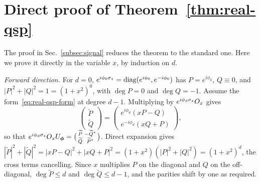 \appendix

\section{Direct proof of Theorem~\ref{thm:real-qsp}}
\label{app:thm-real}

The proof in Sec.~\ref{subsec:signal} reduces the theorem to the
standard one.  Here we prove it directly in the variable $x$, by
induction on $d$.

\emph{Forward direction.}  For $d=0$,
$e^{i\phi_0\sigma_z}=\mathrm{diag}(e^{i\phi_0},e^{-i\phi_0})$ has
$P=e^{i\phi_0}$, $Q\equiv 0$, and $|P|^2+|Q|^2=1=(1+x^2)^0$, with
$\deg P=0$ and $\deg Q=-1$.  Assume the form~\eqref{eq:real-qsp-form}
at degree $d-1$.  Multiplying by $e^{i\phi_d\sigma_z}O_x$ gives
\begin{equation}
	\begin{pmatrix}\widetilde P\\ \widetilde Q\end{pmatrix}
	=\begin{pmatrix} e^{i\phi_d}(xP-Q)\\ e^{-i\phi_d}(xQ+P)\end{pmatrix},
\end{equation}
so that $e^{i\phi_d\sigma_z}O_x U_{\bm\phi}=
\bigl(\begin{smallmatrix}\widetilde P&-\widetilde Q^*\\
\widetilde Q&\widetilde P^*\end{smallmatrix}\bigr)$.  Direct expansion
gives
$|\widetilde P|^2+|\widetilde Q|^2=|xP-Q|^2+|xQ+P|^2
=(1+x^2)(|P|^2+|Q|^2)=(1+x^2)^d$, the cross terms cancelling.  Since
$x$ multiplies $P$ on the diagonal and $Q$ on the off-diagonal,
$\deg\widetilde P\le d$ and $\deg\widetilde Q\le d-1$, and the
parities shift by one as required.

